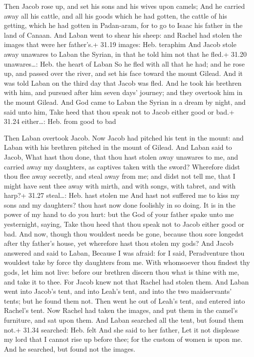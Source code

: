  Then Jacob rose up, and set his sons and his wives upon
camels;  And he carried away all his cattle, and all his
goods which he had gotten, the cattle of his getting, which he had
gotten in Padan-aram, for to go to Isaac his father in the land of
Canaan.  And Laban went to shear his sheep: and Rachel had
stolen the images that were her father's.+ 31.19 images: Heb. teraphim
 And Jacob stole away unawares to Laban the Syrian, in that
he told him not that he fled.+ 31.20 unawares\ldots: Heb. the heart of
Laban  So he fled with all that he had; and he rose up, and
passed over the river, and set his face toward the mount Gilead.
 And it was told Laban on the third day that Jacob was
fled.  And he took his brethren with him, and pursued after
him seven days' journey; and they overtook him in the mount Gilead.
 And God came to Laban the Syrian in a dream by night, and
said unto him, Take heed that thou speak not to Jacob either good or
bad.+ 31.24 either\ldots: Heb. from good to bad

 Then Laban overtook Jacob. Now Jacob had pitched his
tent in the mount: and Laban with his brethren pitched in the mount of
Gilead.  And Laban said to Jacob, What hast thou done, that
thou hast stolen away unawares to me, and carried away my daughters, as
captives taken with the sword?  Wherefore didst thou flee
away secretly, and steal away from me; and didst not tell me, that I
might have sent thee away with mirth, and with songs, with tabret, and
with harp?+ 31.27 steal\ldots: Heb. hast stolen me  And
hast not suffered me to kiss my sons and my daughters? thou hast now
done foolishly in so doing.  It is in the power of my hand
to do you hurt: but the God of your father spake unto me yesternight,
saying, Take thou heed that thou speak not to Jacob either good or bad.
 And now, though thou wouldest needs be gone, because thou
sore longedst after thy father's house, yet wherefore hast thou stolen
my gods?  And Jacob answered and said to Laban, Because I
was afraid: for I said, Peradventure thou wouldest take by force thy
daughters from me.  With whomsoever thou findest thy gods,
let him not live: before our brethren discern thou what is thine with
me, and take it to thee. For Jacob knew not that Rachel had stolen them.
 And Laban went into Jacob's tent, and into Leah's tent,
and into the two maidservants' tents; but he found them not. Then went
he out of Leah's tent, and entered into Rachel's tent.  Now
Rachel had taken the images, and put them in the camel's furniture, and
sat upon them. And Laban searched all the tent, but found them not.+
31.34 searched: Heb. felt  And she said to her father, Let
it not displease my lord that I cannot rise up before thee; for the
custom of women is upon me. And he searched, but found not the images.

